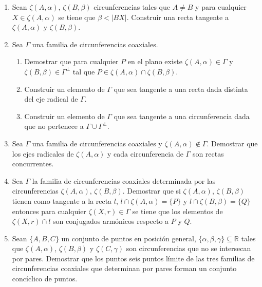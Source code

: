 \documentclass[12pt]{report}
\numberwithin{section}{chapter}
\newcommand{\R}{\mathbb R}
\begin{document}
\begin{enumerate}
\item Sean $\zeta(A, \alpha)$, $\zeta(B, \beta)$ circunferencias tales que $A \neq B$ y para cualquier $X \in \zeta(A, \alpha)$ se tiene que $\beta < |BX|$. Construir una recta tangente a $\zeta(A, \alpha)$ y $\zeta(B, \beta)$.

\item Sea $\Gamma$ una familia de circunferencias coaxiales.
\begin{enumerate}
\item Demostrar que para cualquier $P$ en el plano existe $\zeta(A, \alpha) \in \Gamma$ y $\zeta(B,\beta) \in \Gamma^\bot$ tal que \break $P \in \zeta(A, \alpha) \cap \zeta(B,\beta)$.
\item Construir un elemento de $\Gamma$ que sea tangente a una recta dada distinta del eje radical de $\Gamma$.
\item Construir un elemento de $\Gamma$ que sea tangente a una circunferencia dada que no pertenece a $\Gamma \cup \Gamma^\bot$.
\end{enumerate}
 



\item Sea $\Gamma$ una familia de circunferencias coaxiales y $\zeta(A, \alpha) \notin \Gamma$. Demostrar que los ejes radicales de $\zeta (A, \alpha)$ y cada circunferencia de $\Gamma$ son rectas concurrentes.

\item Sea $\Gamma$ la familia de circunferencias coaxiales determinada por las circunferencias $\zeta(A, \alpha)$, $\zeta(B, \beta)$. Demostrar que si $\zeta(A, \alpha)$, $\zeta(B, \beta)$ tienen como tangente a la recta $l$, $l \cap \zeta(A, \alpha) = \{P\}$ y $l \cap \zeta(B, \beta) = \{Q\}$ entonces para cualquier $\zeta(X,r) \in \Gamma$ se tiene que los elementos de $\zeta(X,r) \cap l$ son conjugados armónicos respecto a $P$ y $Q$.

\item Sean $\{A,B,C\}$ un conjunto de puntos en posición general, $\{\alpha, \beta, \gamma\}\subseteq \R$ tales que $\zeta(A, \alpha)$, $\zeta(B, \beta)$ y $\zeta(C, \gamma)$ son circunferencias que no se intersecan por pares. Demostrar que los puntos seis puntos límite de las tres familias de circunferencias coaxiales que determinan por pares forman un conjunto concíclico de puntos.

\end{enumerate}
\end{document}
